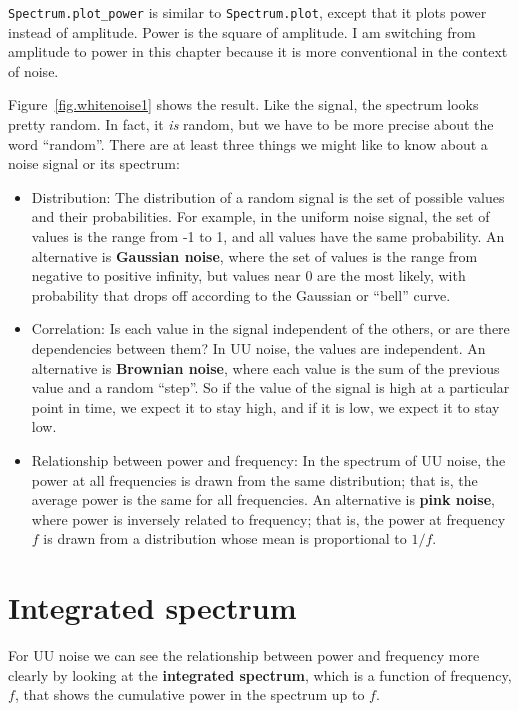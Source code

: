 \documentclass[12pt]{book}
\begin{document}
\verb"Spectrum.plot_power" is similar to \verb"Spectrum.plot",
except that it plots power instead of amplitude.
Power is the square of amplitude.
I am switching from amplitude to power in this chapter because
it is more conventional in the context of noise.

Figure~\ref{fig.whitenoise1} shows the result.  Like the signal, the
spectrum looks pretty random.  In fact, it {\em is} random, but we have to
be more precise about the word ``random''.  There are at least three
things we might like to know about a noise signal or its spectrum:

\begin{itemize}

\item Distribution: The distribution of a random signal is the set of
  possible values and their probabilities.  For example, in the
  uniform noise signal, the set of values is the range from -1 to 1,
  and all values have the same probability.  An alternative is
  {\bf Gaussian noise}, where the set of values is the range from negative
  to positive infinity, but values near 0 are the most likely, with
  probability that drops off according to the Gaussian or
  ``bell'' curve.

\item Correlation: Is each value in the signal independent of the
  others, or are there dependencies between them?  In UU noise, the
  values are independent.
  An alternative is {\bf Brownian noise}, where each value is the sum
  of the previous value and a random ``step''.  So if the value of the
  signal is high at a particular point in time, we expect it to stay
  high, and if it is low, we expect
  it to stay low.

\item Relationship between power and frequency: In the spectrum of UU
  noise, the power at all frequencies is drawn from the same
  distribution; that is, the average power is the same for all
  frequencies.  An alternative is {\bf pink noise}, where power is
  inversely related to frequency; that is, the power at frequency $f$
  is drawn from a distribution whose mean is proportional to $1/f$.

\end{itemize}


\section{Integrated spectrum}

For UU noise we can see the relationship between power and frequency
more clearly by looking at the {\bf integrated spectrum}, which
is a function of frequency, $f$, that shows the cumulative power in
the spectrum up to $f$.
\end{document}

